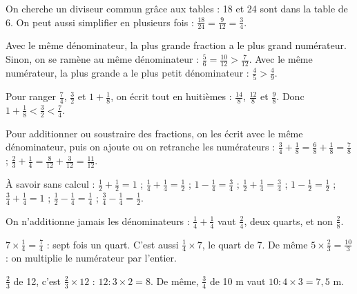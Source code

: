 \begin{savoirfaire}[Simplifier]On cherche un diviseur commun grâce aux tables : 18 et 24 sont dans la table de 6. On peut aussi simplifier en plusieurs fois : $\frac{18}{24}=\frac9{12}=\frac34$.\end{savoirfaire}
\begin{propriete}Avec le même dénominateur, la plus grande fraction a le plus grand numérateur. Sinon, on se ramène au même dénominateur : $\frac56=\frac{10}{12}>\frac7{12}$. Avec le même numérateur, la plus grande a le plus petit dénominateur : $\frac45>\frac49$.\end{propriete}
\begin{exemple}Pour ranger $\frac74$, $\frac32$ et $1+\frac18$, on écrit tout en huitièmes : $\frac{14}8$, $\frac{12}8$ et $\frac98$. Donc $1+\frac18<\frac32<\frac74$.\end{exemple}
\clearpage
{}\label{cours-6-2}
\begin{propriete}Pour additionner ou soustraire des fractions, on les écrit avec le même dénominateur, puis on ajoute ou on retranche les numérateurs : $\frac34+\frac18=\frac68+\frac18=\frac78$ ; $\frac23+\frac14=\frac8{12}+\frac3{12}=\frac{11}{12}$.\end{propriete}
\begin{exemple}À savoir sans calcul : $\frac12+\frac12=1$ ; $\frac14+\frac14=\frac12$ ; $1-\frac14=\frac34$ ; $\frac12+\frac14=\frac34$ ; $1-\frac12=\frac12$ ; $\frac34+\frac14=1$ ; $\frac12-\frac14=\frac14$ ; $\frac34-\frac14=\frac12$.\end{exemple}
\begin{attention}On n’additionne jamais les dénominateurs : $\frac14+\frac14$ vaut $\frac24$, deux quarts, et non $\frac28$.\end{attention}
\begin{propriete}$7\times\frac14=\frac74$ : sept fois un quart. C’est aussi $\frac14\times7$, le quart de 7. De même $5\times\frac23=\frac{10}3$ : on multiplie le numérateur par l’entier.\end{propriete}
\begin{savoirfaire}$\frac23$ de 12, c’est $\frac23\times12$ : $12:3\times2=8$. De même, $\frac34$ de 10 m vaut $10:4\times3=7{,}5$ m.\end{savoirfaire}

